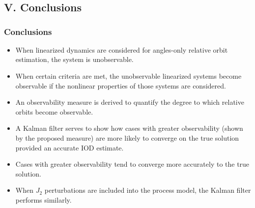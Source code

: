 \documentclass[hyperref={pdftex,pdfpagemode=none,pdfstartview=FitH},10pt]{beamer}
\begin{document}
\section*{}
\subsection*{V. Conclusions}

\begin{frame}
\frametitle{Conclusions}

\begin{itemize}
\item When linearized dynamics are considered for angles-only relative orbit estimation, the system is unobservable.
\item When certain criteria are met, the unobservable linearized systems become observable if the nonlinear properties of those systems are considered.
\item An observability measure is derived to quantify the degree to which relative orbits become observable.
\item A Kalman filter serves to show how cases with greater observability (shown by the proposed measure) are more likely to converge on the true solution provided an accurate IOD estimate.
\item Cases with greater observability tend to converge more accurately to the true solution.
\item When $J_2$ perturbations are included into the process model, the Kalman filter performs similarly.
\end{itemize}

\end{frame}
\end{document}
